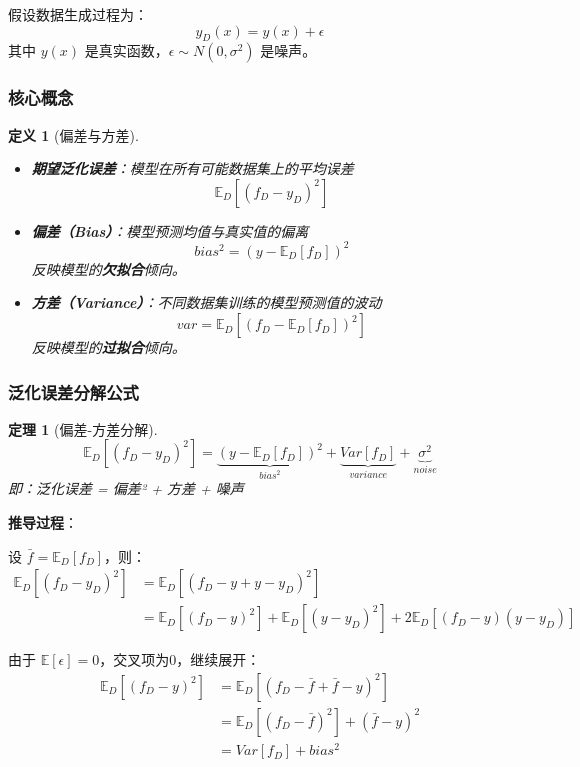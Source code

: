 \documentclass[12pt,a4paper]{ctexart}
\newtheorem{definition}{定义}[section]
\newtheorem{theorem}{定理}[section]
\begin{document}
假设数据生成过程为：
\[
y_D(x) = y(x) + \epsilon
\]
其中 $y(x)$ 是真实函数，$\epsilon \sim N(0, \sigma^2)$ 是噪声。

\subsubsection{核心概念}

\begin{definition}[偏差与方差]
\begin{itemize}
    \item \textbf{期望泛化误差}：模型在所有可能数据集上的平均误差
    \[
    \mathbb{E}_D\left[(f_D - y_D)^2\right]
    \]
    
    \item \textbf{偏差（Bias）}：模型预测均值与真实值的偏离
    \[
    bias^2 = \left(y - \mathbb{E}_D[f_D]\right)^2
    \]
    反映模型的\textbf{欠拟合}倾向。
    
    \item \textbf{方差（Variance）}：不同数据集训练的模型预测值的波动
    \[
    var = \mathbb{E}_D\left[(f_D - \mathbb{E}_D[f_D])^2\right]
    \]
    反映模型的\textbf{过拟合}倾向。
\end{itemize}
\end{definition}

\subsubsection{泛化误差分解公式}

\begin{theorem}[偏差-方差分解]
\[
\mathbb{E}_D\left[(f_D - y_D)^2\right] = \underbrace{\left(y - \mathbb{E}_D[f_D]\right)^2}_{bias^2} + \underbrace{Var[f_D]}_{variance} + \underbrace{\sigma^2}_{noise}
\]
即：泛化误差 = 偏差² + 方差 + 噪声
\end{theorem}

\textbf{推导过程}：

设 $\bar{f} = \mathbb{E}_D[f_D]$，则：
\begin{align*}
\mathbb{E}_D[(f_D - y_D)^2] &= \mathbb{E}_D[(f_D - y + y - y_D)^2] \\
&= \mathbb{E}_D[(f_D - y)^2] + \mathbb{E}_D[(y - y_D)^2] + 2\mathbb{E}_D[(f_D - y)(y - y_D)]
\end{align*}

由于 $\mathbb{E}[\epsilon] = 0$，交叉项为0，继续展开：
\begin{align*}
\mathbb{E}_D[(f_D - y)^2] &= \mathbb{E}_D[(f_D - \bar{f} + \bar{f} - y)^2] \\
&= \mathbb{E}_D[(f_D - \bar{f})^2] + (\bar{f} - y)^2 \\
&= Var[f_D] + bias^2
\end{align*}
\end{document}
